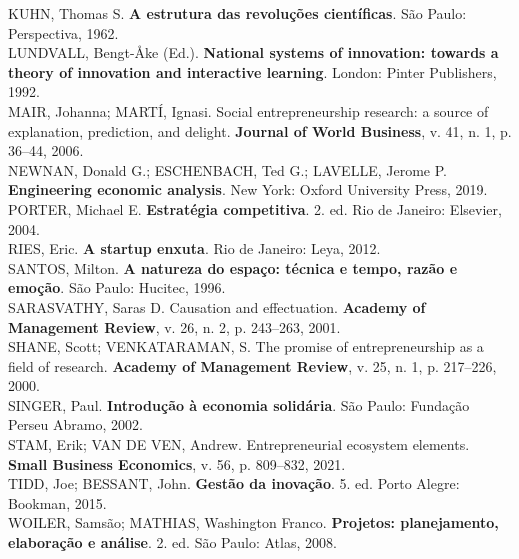 \documentclass[11pt,a4paper]{article}
\begin{document}
\begin{flushleft}
KUHN, Thomas S. \textbf{A estrutura das revoluções científicas}. São Paulo: Perspectiva, 1962.\\[3pt]
LUNDVALL, Bengt-Åke (Ed.). \textbf{National systems of innovation: towards a theory of innovation and interactive learning}. London: Pinter Publishers, 1992.\\[3pt]
MAIR, Johanna; MARTÍ, Ignasi. Social entrepreneurship research: a source of explanation, prediction, and delight. \textbf{Journal of World Business}, v. 41, n. 1, p. 36--44, 2006.\\[3pt]
NEWNAN, Donald G.; ESCHENBACH, Ted G.; LAVELLE, Jerome P. \textbf{Engineering economic analysis}. New York: Oxford University Press, 2019.\\[3pt]
PORTER, Michael E. \textbf{Estratégia competitiva}. 2. ed. Rio de Janeiro: Elsevier, 2004.\\[3pt]
RIES, Eric. \textbf{A startup enxuta}. Rio de Janeiro: Leya, 2012.\\[3pt]
SANTOS, Milton. \textbf{A natureza do espaço: técnica e tempo, razão e emoção}. São Paulo: Hucitec, 1996.\\[3pt]
SARASVATHY, Saras D. Causation and effectuation. \textbf{Academy of Management Review}, v. 26, n. 2, p. 243--263, 2001.\\[3pt]
SHANE, Scott; VENKATARAMAN, S. The promise of entrepreneurship as a field of research. \textbf{Academy of Management Review}, v. 25, n. 1, p. 217--226, 2000.\\[3pt]
SINGER, Paul. \textbf{Introdução à economia solidária}. São Paulo: Fundação Perseu Abramo, 2002.\\[3pt]
STAM, Erik; VAN DE VEN, Andrew. Entrepreneurial ecosystem elements. \textbf{Small Business Economics}, v. 56, p. 809--832, 2021.\\[3pt]
TIDD, Joe; BESSANT, John. \textbf{Gestão da inovação}. 5. ed. Porto Alegre: Bookman, 2015.\\[3pt]
WOILER, Samsão; MATHIAS, Washington Franco. \textbf{Projetos: planejamento, elaboração e análise}. 2. ed. São Paulo: Atlas, 2008.
\end{flushleft}
\end{document}
